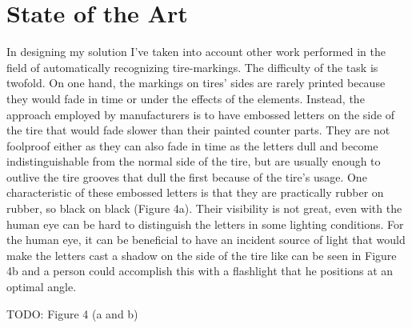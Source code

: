 \chapter{State of the Art}\pagestyle{fancy}\setlength{\parindent}{3em}
\label{chap:state-of-the-art}

In designing my solution I've taken into account other work performed in the field of automatically recognizing tire-markings. The difficulty of the task is twofold. On one hand, the markings on tires' sides are rarely printed because they would fade in time or under the effects of the elements. Instead, the approach employed by manufacturers is to have embossed letters on the side of the tire that would fade slower than their painted counter parts. They are not foolproof either as they can also fade in time as the letters dull and become indistinguishable from the normal side of the tire, but are usually enough to outlive the tire grooves that dull the first because of the tire's usage. One characteristic of these embossed letters is that they are practically rubber on rubber, so black on black (Figure 4a). Their visibility is not great, even with the human eye can be hard to distinguish the letters in some lighting conditions. For the human eye, it can be beneficial to have an incident source of light that would make the letters cast a shadow on the side of the tire like can be seen in Figure 4b and a person could accomplish this with a flashlight that he positions at an optimal angle.

TODO: Figure 4 (a and b)

